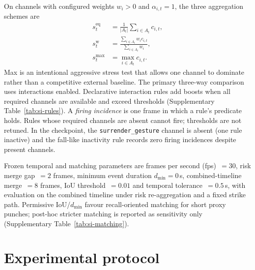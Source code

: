 \documentclass[preprint,12pt,numbers,sort&compress]{elsarticle}
\begin{document}
On channels with configured weights $w_i>0$ and $\alpha_{i,t}{=}1$, the three aggregation schemes are
\begin{align}
s^{\mathrm{eq}}_t &= \frac{1}{|A_t|}\sum_{i\in A_t} c_{i,t}, \\
s^{\mathrm{w}}_t &= \frac{\sum_{i\in A_t} w_i c_{i,t}}{\sum_{i\in A_t} w_i}, \\
s^{\mathrm{max}}_t &= \max_{i\in A_t} c_{i,t}.
\end{align}
Max is an intentional aggressive stress test that allows one channel to dominate rather than a competitive external baseline.
The primary three-way comparison uses interactions enabled.
Declarative interaction rules add boosts when all required channels are available and exceed thresholds (Supplementary Table~\ref{tab:si-rules}).
A \emph{firing incidence} is one frame in which a rule's predicate holds.
Rules whose required channels are absent cannot fire; thresholds are not retuned.
In the checkpoint, the \texttt{surrender\_gesture} channel is absent (one rule inactive) and the fall-like inactivity rule records zero firing incidences despite present channels.

Frozen temporal and matching parameters are frames per second (fps)~$=30$, risk merge gap~$=2$ frames, minimum event duration $d_{\min}{=}0$\,s, combined-timeline merge~$=8$ frames, IoU threshold~$=0.01$ and temporal tolerance~$=0.5$\,s, with evaluation on the combined timeline under risk re-aggregation and a fixed strike path.
Permissive IoU/$d_{\min}$ favour recall-oriented matching for short proxy punches; post-hoc stricter matching is reported as sensitivity only (Supplementary Table~\ref{tab:si-matching}).

\section{Experimental protocol}
\label{sec:protocol}
\end{document}
